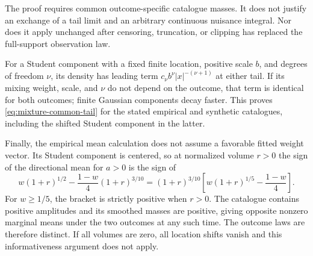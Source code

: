 The proof requires common outcome-specific catalogue masses. It does not
justify an exchange of a tail limit and an arbitrary continuous nuisance
integral. Nor does it apply unchanged after censoring, truncation, or clipping
has replaced the full-support observation law.

For a Student component with a fixed finite location, positive scale $b$, and
degrees of freedom $\nu$, its density has leading term
$c_\nu b^\nu |x|^{-(\nu+1)}$ at either tail. If its mixing weight, scale, and
$\nu$ do not depend on the outcome, that term is identical for both outcomes;
finite Gaussian components decay faster. This proves
\eqref{eq:mixture-common-tail} for the stated empirical and synthetic
catalogues, including the shifted Student component in the latter.

Finally, the empirical mean calculation does not assume a favorable fitted
weight vector. Its Student component is centered, so at normalized volume
$r>0$ the sign of the directional mean for $a>0$ is the sign of
\[
 w(1+r)^{1/2}-\frac{1-w}{4}(1+r)^{3/10}
 =(1+r)^{3/10}\left[w(1+r)^{1/5}-\frac{1-w}{4}\right].
\]
For $w\geq1/5$, the bracket is strictly positive when $r>0$. The catalogue
contains positive amplitudes and its smoothed masses are positive, giving
opposite nonzero marginal means under the two outcomes at any such time.
The outcome laws are therefore distinct. If all volumes are zero, all
location shifts vanish and this informativeness argument does not apply.
